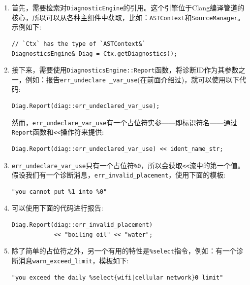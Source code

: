 \begin{enumerate}
\item 首先，需要检索对\texttt{DiagnosticEngine}的引用。这个引擎位于Clang编译管道的核心，所以可以从各种主组件中获取，比如：\texttt{ASTContext}和\texttt{SourceManager}。示例如下:

\begin{lstlisting}[style=styleJavaScript]
// `Ctx` has the type of `ASTContext&`
DiagnosticsEngine& Diag = Ctx.getDiagnostics();
\end{lstlisting}

\item 接下来，需要使用\texttt{DiagnosticsEngine::Report}函数，将诊断ID作为其参数之一，例如：报告\texttt{err\_undeclare \_var\_use}(在前面介绍过)，就可以使用以下代码:

\begin{lstlisting}[style=styleJavaScript]
Diag.Report(diag::err_undeclared_var_use);
\end{lstlisting}

然而，\texttt{err\_undeclare\_var\_use}有一个占位符实参——即标识符名——通过\texttt{Report}函数和\texttt{<<}操作符来提供:

\begin{lstlisting}[style=styleJavaScript]
Diag.Report(diag::err_undeclared_var_use) << ident_name_str;
\end{lstlisting}

\item \texttt{err\_undeclare\_var\_use}只有一个占位符\texttt{\%0}，所以会获取\texttt{<<}流中的第一个值。假设我们有一个诊断消息，\texttt{err\_invalid\_placement}，使用下面的模板:

\begin{lstlisting}[style=styleJavaScript]
"you cannot put %1 into %0"
\end{lstlisting}

\item 可以使用下面的代码进行报告:
\begin{lstlisting}[style=styleJavaScript]
Diag.Report(diag::err_invalid_placement)
            << "boiling oil" << "water";
\end{lstlisting}

\item 除了简单的占位符之外，另一个有用的特性是\texttt{\%select}指令，例如：有一个诊断消息\texttt{warn\_exceed\_limit}，模板如下:

\begin{lstlisting}[style=styleJavaScript]
"you exceed the daily %select{wifi|cellular network}0 limit"
\end{lstlisting}


\end{enumerate}
